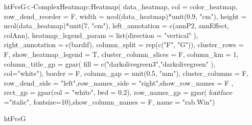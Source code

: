\documentclass[]{interact}
\theoremstyle{plain}%
\theoremstyle{definition}
\theoremstyle{remark}
\newenvironment{Shaded}{\begin{snugshade}}{\end{snugshade}}
\newcommand{\AttributeTok}[1]{\textcolor[rgb]{0.77,0.63,0.00}{#1}}
\newcommand{\DecValTok}[1]{\textcolor[rgb]{0.00,0.00,0.81}{#1}}
\newcommand{\FloatTok}[1]{\textcolor[rgb]{0.00,0.00,0.81}{#1}}
\newcommand{\FunctionTok}[1]{\textcolor[rgb]{0.00,0.00,0.00}{#1}}
\newcommand{\NormalTok}[1]{#1}
\newcommand{\OtherTok}[1]{\textcolor[rgb]{0.56,0.35,0.01}{#1}}
\newcommand{\SpecialCharTok}[1]{\textcolor[rgb]{0.00,0.00,0.00}{#1}}
\newcommand{\StringTok}[1]{\textcolor[rgb]{0.31,0.60,0.02}{#1}}
\begin{document}
\begin{Shaded}
\begin{Highlighting}[]
\NormalTok{htFvsG}\OtherTok{\textless{}{-}}\NormalTok{ComplexHeatmap}\SpecialCharTok{::}\FunctionTok{Heatmap}\NormalTok{(}
\NormalTok{  data\_heatmap, }\AttributeTok{col =}\NormalTok{ color\_heatmap, }\AttributeTok{row\_dend\_reorder =}\NormalTok{ F, }
  \AttributeTok{width =} \FunctionTok{ncol}\NormalTok{(data\_heatmap)}\SpecialCharTok{*}\FunctionTok{unit}\NormalTok{(}\FloatTok{0.9}\NormalTok{, }\StringTok{"cm"}\NormalTok{),}
  \AttributeTok{height =} \FunctionTok{ncol}\NormalTok{(data\_heatmap)}\SpecialCharTok{*}\FunctionTok{unit}\NormalTok{(}\DecValTok{7}\NormalTok{, }\StringTok{"cm"}\NormalTok{),}
  \AttributeTok{left\_annotation =}  \FunctionTok{c}\NormalTok{(annP2, annEffect, colAnn),}
  \AttributeTok{heatmap\_legend\_param =} \FunctionTok{list}\NormalTok{(}\AttributeTok{direction =} \StringTok{"vertical"}\NormalTok{ ),}
  \AttributeTok{right\_annotation =} \FunctionTok{c}\NormalTok{(bardif),}
  \AttributeTok{column\_split =} \FunctionTok{rep}\NormalTok{(}\FunctionTok{c}\NormalTok{(}\StringTok{"F"}\NormalTok{, }\StringTok{"G"}\NormalTok{)),}
  \AttributeTok{cluster\_rows =}\NormalTok{ F, }\AttributeTok{show\_heatmap\_legend =}\NormalTok{ T,}
  \AttributeTok{cluster\_column\_slices =}\NormalTok{ F,}
  \AttributeTok{column\_km =} \DecValTok{1}\NormalTok{, }\AttributeTok{column\_title\_gp =} \FunctionTok{gpar}\NormalTok{(}
  \AttributeTok{fill =} \FunctionTok{c}\NormalTok{(}\StringTok{"darkolivegreen3"}\NormalTok{,}\StringTok{"darkolivegreen"}\NormalTok{ ), }\AttributeTok{col=}\StringTok{"white"}\NormalTok{),}
  \AttributeTok{border =}\NormalTok{ F, }\AttributeTok{column\_gap =} \FunctionTok{unit}\NormalTok{(}\FloatTok{0.5}\NormalTok{, }\StringTok{"mm"}\NormalTok{),}
  \AttributeTok{cluster\_columns =}\NormalTok{ F,}
  \AttributeTok{row\_dend\_side =} \StringTok{"left"}\NormalTok{,}\AttributeTok{row\_names\_side =} \StringTok{"right"}\NormalTok{,}\AttributeTok{show\_row\_names =}\NormalTok{ F ,}
  \AttributeTok{rect\_gp =} \FunctionTok{gpar}\NormalTok{(}\AttributeTok{col =} \StringTok{"white"}\NormalTok{, }\AttributeTok{lwd =} \FloatTok{0.2}\NormalTok{), }\AttributeTok{row\_names\_gp =} \FunctionTok{gpar}\NormalTok{(}
  \AttributeTok{fontface =}\StringTok{"italic"}\NormalTok{, }\AttributeTok{fontsize=}\DecValTok{10}\NormalTok{),}\AttributeTok{show\_column\_names =}\NormalTok{ F, }\AttributeTok{name =} \StringTok{"rab.Win"}\NormalTok{)}

\NormalTok{htFvsG}
\end{Highlighting}
\end{Shaded}
\end{document}
